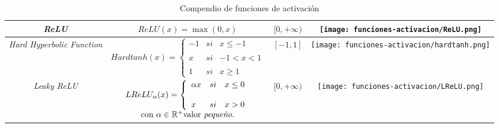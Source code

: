 \begin{table}[H]
{\begin{tabular}{| c | c | c | c |}
        \hline
        \textit{ReLU}
        & %
        $ReLU(x) = \max(0,x)$
        & %
        $[0,+\infty)$
        & %
        \begin{minipage}{\coeficienteAncho\textwidth}
            \texttt{[image: funciones-activacion/ReLU.png]}
        \end{minipage}
        \\
        \hline
        \textit{Hard Hyperbolic Function}
        & %
        $Hardtanh(x) =\left\{ \begin{array}{lcc}
            -1 &   si  & x \leq -1 \\
            \\ x &  si & -1< x < 1 \\
            \\ 1&  si  & x \geq 1 
            \end{array}
        \right.$
        & %
        $[-1,1]$
        & %
        \begin{minipage}{\coeficienteAncho\textwidth}
            \texttt{[image: funciones-activacion/hardtanh.png]}
        \end{minipage}
        \\
        \hline
        \textit{Leaky ReLU}
        & %
        $\begin{array}{c}

            LReLU_{\alpha}(x) =\left\{ \begin{array}{lcc}
            \alpha x &   si  & x \leq 0 \\
            \\ x&  si  & x > 0 
            \end{array}
            \right.
        \\
        \text{con } \alpha \in \R^+ \text{valor }\textit{pequeño}.
        \end{array}
        $
        & %
        $[0, +\infty)$
        & %
        \begin{minipage}{\coeficienteAncho\textwidth}
            \texttt{[image: funciones-activacion/LReLU.png]}
        \end{minipage}
        \\
        \hline
    \end{tabular}
    } %
    \caption{Compendio de funciones de activación}  
    \label{table:funciones-de-activation}
\end{table}

